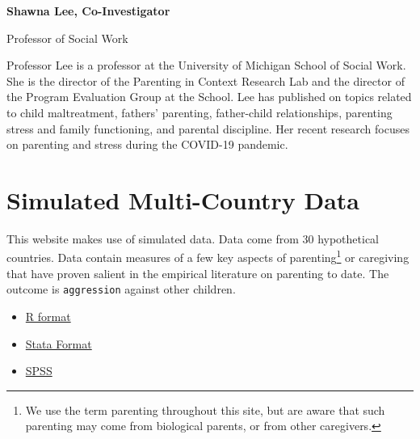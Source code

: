 \documentclass[
  letterpaper,
  DIV=11,
  numbers=noendperiod]{scrreprt}
\providecommand{\tightlist}{%
  \setlength{\itemsep}{0pt}\setlength{\parskip}{0pt}}\usepackage{longtable,booktabs,array}
\begin{document}
\textbf{Shawna Lee, Co-Investigator}

Professor of Social Work

Professor Lee is a professor at the University of Michigan School of
Social Work. She is the director of the Parenting in Context Research
Lab and the director of the Program Evaluation Group at the School. Lee
has published on topics related to child maltreatment, fathers'
parenting, father-child relationships, parenting stress and family
functioning, and parental discipline. Her recent research focuses on
parenting and stress during the COVID-19 pandemic.


\hypertarget{simulated-multi-country-data}{%
\chapter{Simulated Multi-Country
Data}\label{simulated-multi-country-data}}

This website makes use of simulated data. Data come from 30 hypothetical
countries. Data contain measures of a few key aspects of
parenting\footnote{We use the term parenting throughout this site, but
  are aware that such parenting may come from biological parents, or
  from other caregivers.} or caregiving that have proven salient in the
empirical literature on parenting to date. The outcome is
\texttt{aggression} against other children.

\begin{tcolorbox}[enhanced jigsaw, breakable, colback=white, leftrule=.75mm, coltitle=black, toprule=.15mm, arc=.35mm, colframe=quarto-callout-note-color-frame, colbacktitle=quarto-callout-note-color!10!white, left=2mm, title=\textcolor{quarto-callout-note-color}{\faInfo}\hspace{0.5em}{Download The Data}, rightrule=.15mm, toptitle=1mm, opacityback=0, opacitybacktitle=0.6, bottomrule=.15mm, bottomtitle=1mm, titlerule=0mm]

\begin{itemize}
\tightlist
\item
  \href{https://github.com/agrogan1/globalfamilies/raw/main/simulate-data/MICSsimulated.RData}{R
  format}
\item
  \href{https://github.com/agrogan1/globalfamilies/raw/main/simulate-data/MICSsimulated.dta}{Stata
  Format}
\item
  \href{https://github.com/agrogan1/globalfamilies/raw/main/simulate-data/MICSsimulated.sav}{SPSS}
\end{itemize}

\end{tcolorbox}
\end{document}
